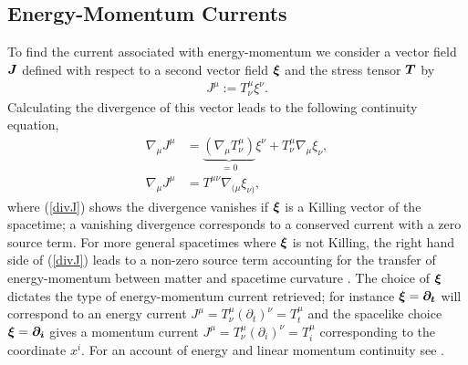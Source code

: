 \subsection{Energy-Momentum Currents} \label{sect:mattercont}
To find the current associated with energy-momentum we consider a vector field $\boldsymbol{J}$ defined with respect to a second vector field $\boldsymbol{\xi}$ and the stress tensor $\boldsymbol{T}$ by
\begin{align}
\label{Killing current}J^\mu := T^\mu_\nu \xi^\nu. 
\end{align}
Calculating the divergence of this vector leads to the following continuity equation,
\begin{align}
\nabla_\mu J^\mu &= \underbrace{(\nabla_\mu T^\mu_\nu )}_{=0}\xi^\nu + T^\mu_\nu \nabla_\mu  \xi_\nu, \\
\label{divJ}\nabla_\mu J^\mu &= T^{\mu\nu} \nabla_{(\mu}  \xi_{\nu)},
\end{align}
where (\ref{divJ}) shows the divergence vanishes if $\boldsymbol{\xi}$ is a Killing vector of the spacetime; a vanishing divergence corresponds to a conserved current with a zero source term. For more general spacetimes where $\boldsymbol{\xi}$ is not Killing, the right hand side of (\ref{divJ}) leads to a non-zero source term accounting for the transfer of energy-momentum between matter and spacetime curvature \cite{Clough_2021}. The choice of $\boldsymbol{\xi}$ dictates the type of energy-momentum current retrieved; for instance $\boldsymbol{\xi} = \boldsymbol{\partial_t}$ will correspond to an energy current $J^\mu = T^\mu_\nu (\partial_t)^\nu = T^\mu_t$ and the spacelike choice $\boldsymbol{\xi} = \boldsymbol{\partial_i}$ gives a momentum current $J^\mu = T^\mu_\nu (\partial_i)^\nu=T^\mu_i$ corresponding to the coordinate $x^i$. For an account of energy and linear momentum continuity see \cite{Clough_2021}.




